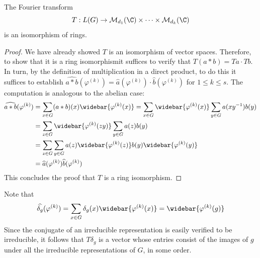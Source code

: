 \begin{theorem}
The Fourier transform
\[T:L(G)\to\mathcal{M}_{d_1}(\C)\times\cdots\times\mathcal{M}_{d_k}(\C)\]
is an isomorphism of rings.
\end{theorem}
\begin{proof}
We have already showed $T$ is an isomorphism of vector spaces. Therefore, to show that it is a ring isomorphismit suffices to verify that $T(a\ast b)=Ta\cdot Tb$. In turn, by the definition of multiplication in a direct product, to do this it suffices to establish $\widehat{a\ast b}(\varphi^{(k)})=\widehat{a}(\varphi^{(k)})\cdot\widehat{b}(\varphi^{(k)})$ for $1\leq k\leq s$. The computation is analogous to the abelian case:
\begin{align*}
\widehat{a\ast b}(\varphi^{(k)})&=\sum_{x\in G}(a\ast b)(x)\widebar{\varphi^{(k)}(x)}=\sum_{x\in G}\widebar{\varphi^{(k)}(x)}\sum_{y\in G}a(xy^{-1})b(y)\\
&=\sum_{z\in G}\widebar{\varphi^{(k)}(zy)}\sum_{y\in G}a(z)b(y)\\
&=\sum_{z\in G}\sum_{y\in G}a(z)\widebar{\varphi^{(k)}(z)}b(y)\widebar{\varphi^{(k)}(y)}\\
&=\widehat{a}(\varphi^{(k)})\widehat{b}(\varphi^{(k)})
\end{align*}
This concludes the proof that $T$ is a ring isomorphism.
\end{proof}
\begin{remark}
Note that
\[\widehat{\delta_g}(\varphi^{(k)})=\sum_{x\in G}\delta_g(x)\widebar{\varphi^{(k)}(x)}=\widebar{\varphi^{(k)}(g)}\]
Since the conjugate of an irreducible representation is easily verified to be irreducible, it follows that $T\delta_g$ is a vector whose entries consist of the images of $g$ under all the irreducible representations of $G$, in some order.
\end{remark}